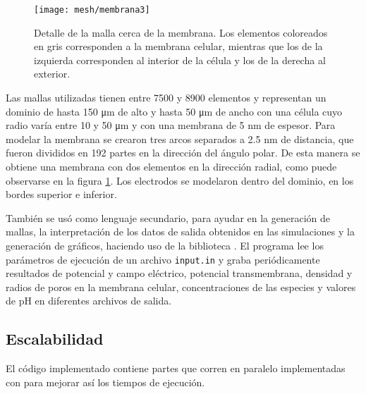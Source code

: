 \begin{figure}
	\texttt{[image: mesh/membrana3]}
	\caption{Detalle de la malla cerca de la membrana. Los elementos coloreados en gris corresponden a la membrana celular, mientras que los de la izquierda corresponden al interior de la célula y los de la derecha al exterior.}
	\label{fig:mesh-membrana}
\end{figure}

Las mallas utilizadas tienen entre 7500 y 8900 elementos y representan un dominio de hasta 150 \si{\micro\metre} de alto y hasta 50 \si{\micro\metre} de ancho con una célula cuyo radio varía entre 10 y 50 \si{\micro\metre} y con una membrana de 5 \si{\nano\metre} de espesor. Para modelar la membrana se crearon tres arcos separados a 2.5 \si{\nano\metre} de distancia, que fueron divididos en 192 partes en la dirección del ángulo polar. De esta manera se obtiene una membrana con dos elementos en la dirección radial, como puede observarse en la figura \ref{fig:mesh-membrana}. Los electrodos se modelaron dentro del dominio, en los bordes superior e inferior.

También se usó  como lenguaje secundario, para ayudar en la generación de mallas, la interpretación de los datos de salida obtenidos en las simulaciones y la generación de gráficos, haciendo uso de la biblioteca  \cite{matplotlib}. El programa lee los parámetros de ejecución de un archivo \texttt{input.in} y graba periódicamente resultados de potencial y campo eléctrico, potencial transmembrana, densidad y radios de poros en la membrana celular, concentraciones de las especies y valores de pH en diferentes archivos de salida.


\subsection*{Escalabilidad}

El código implementado contiene partes que corren en paralelo implementadas con  para mejorar así los tiempos de ejecución.\\

